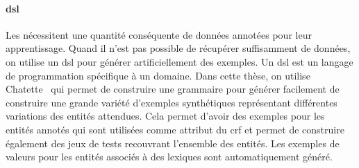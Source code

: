 \paragraph{\acrshort*{dsl}}
Les  nécessitent une quantité conséquente de données annotées pour leur apprentissage.
Quand il n'est pas possible de récupérer suffisamment de données, on utilise un \gls{dsl} pour générer artificiellement des exemples.
Un \gls{dsl} est un langage de programmation spécifique à un domaine.
Dans cette thèse, on utilise Chatette~\cite{ChatetteDatasetGenerator2024} qui permet de construire une grammaire pour générer facilement de construire une grande variété d'exemples synthétiques représentant différentes variations des entités attendues.
Cela permet d'avoir des exemples pour les entités annotés qui sont utilisées comme attribut du \gls{crf} et permet de construire également des jeux de tests recouvrant l'ensemble des entités.
Les exemples de valeurs pour les entités associés à des lexiques sont automatiquement généré.
